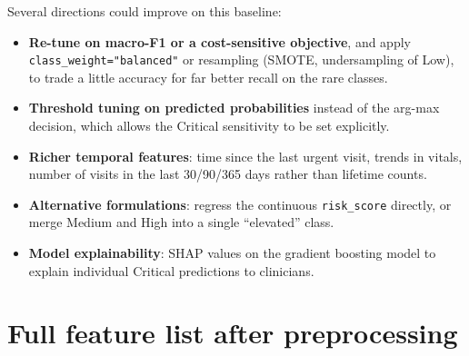\documentclass[11pt,a4paper]{article}
\newcommand{\code}[1]{\texttt{\textcolor{codegrey}{#1}}}
\newcommand{\sect}[1]{\section{#1}}
\begin{document}
Several directions could improve on this baseline:

\begin{itemize}[itemsep=2pt]
  \item \textbf{Re-tune on macro-F1 or a cost-sensitive objective}, and apply
        \code{class\_weight="balanced"} or resampling (SMOTE, undersampling of Low), to trade a
        little accuracy for far better recall on the rare classes.
  \item \textbf{Threshold tuning on predicted probabilities} instead of the arg-max decision,
        which allows the Critical sensitivity to be set explicitly.
  \item \textbf{Richer temporal features}: time since the last urgent visit, trends in vitals,
        number of visits in the last 30/90/365 days rather than lifetime counts.
  \item \textbf{Alternative formulations}: regress the continuous \code{risk\_score} directly, or
        merge Medium and High into a single ``elevated'' class.
  \item \textbf{Model explainability}: SHAP values on the gradient boosting model to explain
        individual Critical predictions to clinicians.
\end{itemize}

\appendix
\sect{Full feature list after preprocessing}
\label{app:features}
\end{document}
